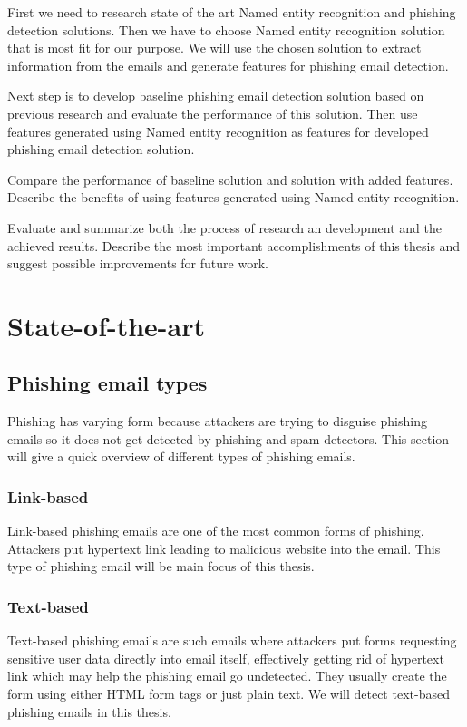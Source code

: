 \documentclass[thesis=B,english]{FITthesis}[2012/10/20]
\begin{document}
\par First we need to research state of the art Named entity recognition and phishing detection solutions.
Then we have to choose Named entity recognition solution that is most fit for our purpose.
We will use the chosen solution to extract information from the emails and generate features for phishing email detection.

\par Next step is to develop baseline phishing email detection solution based on previous research and evaluate the performance of this solution.
Then use features generated using Named entity recognition as features for developed phishing email detection solution.

\par Compare the performance of baseline solution and solution with added features. Describe the benefits of using features generated using Named entity recognition.

\par Evaluate and summarize both the process of research an development and the achieved results. Describe the most important accomplishments of this thesis and suggest possible improvements for future work. 



\chapter{State-of-the-art}
\section{Phishing email types}
Phishing has varying form because attackers are trying to disguise phishing emails so it does not get detected by phishing and spam detectors. This section will give a quick overview of different types of phishing emails.

\subsection{Link-based} 
Link-based phishing emails are one of the most common forms of phishing. Attackers put hypertext link leading to malicious website into the email. This type of phishing email will be main focus of this thesis.
\subsection{Text-based}
Text-based phishing emails are such emails where attackers put forms requesting sensitive user data directly into email itself, effectively getting rid of hypertext link which may help the phishing email go undetected. They usually create the form using either HTML form tags \cite{w3form} or just plain text. We will detect text-based phishing emails in this thesis.
\end{document}
